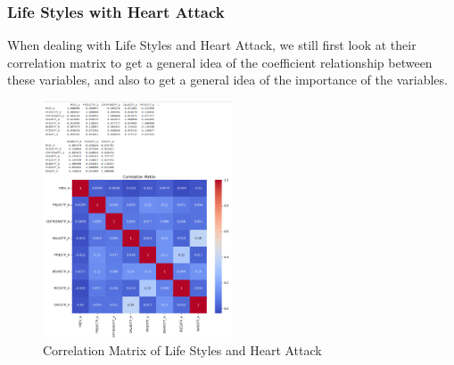 \documentclass{article}
\begin{document}
\subsubsection{Life Styles with Heart Attack}

When dealing with Life Styles and Heart Attack, we still first look at their correlation matrix to get a general idea of the coefficient relationship between these variables, and also to get a general idea of the importance of the variables.

\begin{figure}[!h]
	\centering
	\includegraphics[width=0.5\textwidth]{../Image/P23.jpg}
	\caption{Correlation Matrix of Life Styles and Heart Attack}
	\label{fig:P5}
\end{figure}


\end{document}
